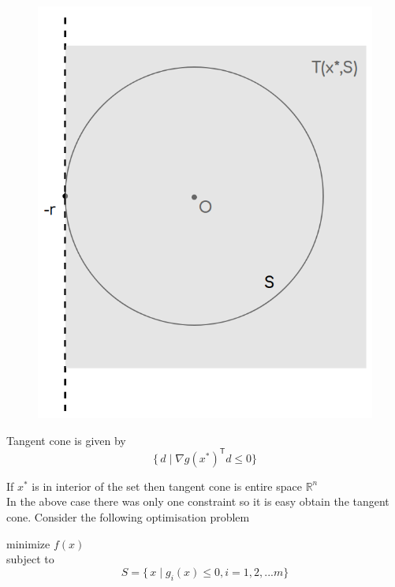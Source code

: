 \documentclass[twoside]{article}
\begin{document}
\begin{figure}[h]
\center
\includegraphics[scale=0.35]{images/pic4.png}
\end{figure}

Tangent cone is given by 
$$ \{\,d\mid \nabla g(x^*)^\mathsf{T}d\leq 0 \}$$

If $x^{*}$ is in interior of the set then tangent cone is entire space $\mathbb{R}^n$\\

In the above case there was only one constraint so it is easy obtain the tangent cone. Consider the following optimisation problem 
\begin{center}
	minimize $f(x)$\\
	subject to $$S = \{\,x\mid g_{i}(x)\leq 0 , i = 1,2,...m\}$$
\end{center}
\end{document}
